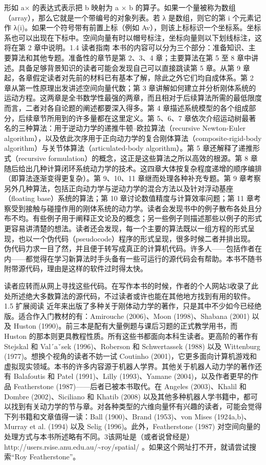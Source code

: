 形如 a× 的表达式表示把 b 映射为 a × b 的算子。如果一个量被称为数组（array），那么它就是一个带编号的对象列表。若 λ 是数组，则它的第 i 个元素记作 λ(i)。如果一个符号带有前置上标（例如 Av），则该上标标识一个坐标系。坐标系也可以出现在下标中。空间向量有时以帽号标注，坐标向量则以下划线标注，这将在第 2 章中说明。1.4 读者指南 本书的内容可以分为三个部分：准备知识、主要算法和其他专题。准备性的章节是第 2、3、4 章；主要算法在第 5 至 8 章中讲述。具备足够背景知识的读者可能会发现自己可以直接跳读第 5 章。从第 9 章起，各章假定读者对先前的材料已有基本了解，除此之外它们均自成体系。第 2 章从第一性原理出发讲述空间向量代数；第 3 章讲解如何建立并分析刚体系统的运动方程。这两章是全书数学性最强的两章，而且相对于后续算法所需的最低限度而言，二者对各自论题的阐述都要深入得多。第 4 章描述系统模型的各个组成部分，后续章节所用到的许多量都在这里定义。第 5、6、7 章依次介绍运动树最著名的三种算法：用于逆动力学的递推牛顿–欧拉算法（recursive Newton-Euler algorithm），以及依此次序用于正向动力学的复合刚体算法（composite-rigid-body algorithm）与关节体算法（articulated-body algorithm）。第 5 章还解释了递推形式（recursive formulation）的概念，这正是这些算法之所以高效的根源。第 8 章随后给出几种计算闭环系统动力学的技术。这四章大体按复杂程度递增的顺序编排（即算法逐渐变得更复杂）。第 9、10、11 章继而处理各种补充专题。第 9 章考察另外几种算法，包括正向动力学与逆动力学的混合方法以及针对浮动基座（floating base）系统的算法；第 10 章讨论数值精度与计算效率问题；第 11 章考察受到接触与碰撞作用的刚体系统的动力学。读者会发现书中的例子散布各处且分布不均。有些例子用于阐释正文论及的概念；另一些例子则描述那些以例子的形式更容易讲清楚的想法。读者还会发现，每一个主要的算法既以一组方程的形式呈现，也以一个伪代码（pseudocode）程序的形式呈现，很多时候二者并排出现。伪代码力求一目了然，并且便于转写成真正的计算机代码。许多人——包括作者在内——都觉得在学习新算法时手头备有一些可运行的源代码会有帮助。本书不随书附带源代码，理由是这样的软件过时得太快。

读者应转而从网上寻找这些代码。在写作本书的时候，作者的个人网站3收录了此处所述绝大多数算法的源代码，不过读者或许也能在其他地方找到有用的软件。1.5 扩展阅读 近年来出版了多种关于刚体动力学的著作，只是其中不少如今已经绝版。适合作入门教材的有：Amirouche (2006)、Moon (1998)、Shabana (2001) 以及 Huston (1990)。前三本是配有大量例题与课后习题的正式教学用书，而 Huston 的那本则更具教程性质。所有这些书都面向本科生读者。更高阶的著作有 Stejskal 和 Val´aˇsek (1996)、Roberson 和 Schwertassek (1988) 以及 Wittenburg (1977)。想换个视角的读者不妨一试 Coutinho (2001)，它更多面向计算机游戏和虚拟现实领域。本书的许多内容源于机器人学界。其他关于机器人动力学的著作还有 Balafoutis 和 Patel (1991)、Lilly (1993)、Yamane (2004)，以及作者更早的作品 Featherstone (1987)——后者已被本书取代。在 Angeles (2003)、Khalil 和 Dombre (2002)、Siciliano 和 Khatib (2008) 以及其他多种机器人学书籍中，都可以找到有关动力学的节与章。对各种类型的六维向量怀有兴趣的读者，可能会觉得下列书籍和文章值得一读：Ball (1900)、Brand (1953)、von Mises (1924a,b)、Murray et al. (1994) 以及 Selig (1996)。此外，Featherstone (1987) 对空间向量的处理方式与本书所述略有不同。3该网址是（或者说曾经是）http://users.rsise.anu.edu.au/\textasciitilde{}roy/spatial/ 。如果这个网址打不开，就请尝试搜索“Roy Featherstone”。
